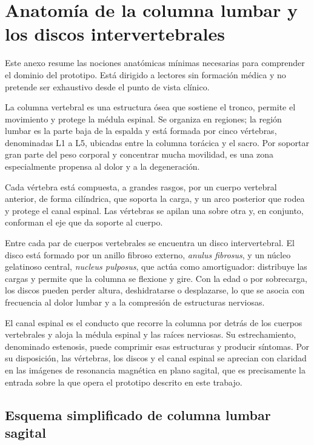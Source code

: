 \chapter{Anatomía de la columna lumbar y los discos intervertebrales}
\label{anexo:anatomia-lumbar}

Este anexo resume las nociones anatómicas mínimas necesarias para comprender el dominio del prototipo. Está dirigido a lectores sin formación médica y no pretende ser exhaustivo desde el punto de vista clínico.

La columna vertebral es una estructura ósea que sostiene el tronco, permite el movimiento y protege la médula espinal. Se organiza en regiones; la región lumbar es la parte baja de la espalda y está formada por cinco vértebras, denominadas L1 a L5, ubicadas entre la columna torácica y el sacro. Por soportar gran parte del peso corporal y concentrar mucha movilidad, es una zona especialmente propensa al dolor y a la degeneración.

Cada vértebra está compuesta, a grandes rasgos, por un cuerpo vertebral anterior, de forma cilíndrica, que soporta la carga, y un arco posterior que rodea y protege el canal espinal. Las vértebras se apilan una sobre otra y, en conjunto, conforman el eje que da soporte al cuerpo.

Entre cada par de cuerpos vertebrales se encuentra un disco intervertebral. El disco está formado por un anillo fibroso externo, \textit{anulus fibrosus}, y un núcleo gelatinoso central, \textit{nucleus pulposus}, que actúa como amortiguador: distribuye las cargas y permite que la columna se flexione y gire. Con la edad o por sobrecarga, los discos pueden perder altura, deshidratarse o desplazarse, lo que se asocia con frecuencia al dolor lumbar y a la compresión de estructuras nerviosas.

El canal espinal es el conducto que recorre la columna por detrás de los cuerpos vertebrales y aloja la médula espinal y las raíces nerviosas. Su estrechamiento, denominado estenosis, puede comprimir esas estructuras y producir síntomas. Por su disposición, las vértebras, los discos y el canal espinal se aprecian con claridad en las imágenes de resonancia magnética en plano sagital, que es precisamente la entrada sobre la que opera el prototipo descrito en este trabajo.

\section{Esquema simplificado de columna lumbar sagital}

